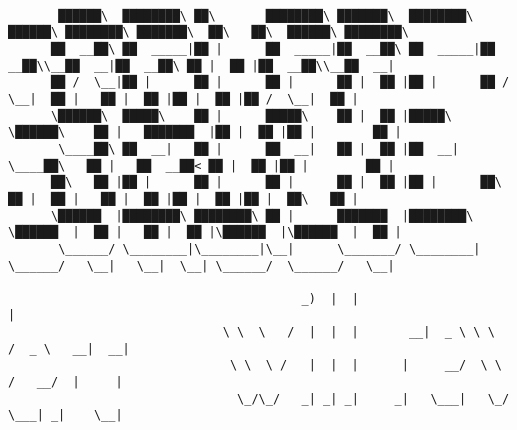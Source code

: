 \documentclass[varwidth=\maxdimen,margin=0.5cm,multi={verbatim}]{standalone}
\begin{document}
\begin{verbatim}

       ██████\  ████████\ ██\       ████████\ ███████\  ████████\  ██████\ ████████\ ███████\  ██\   ██\  ██████\ ████████\ 
      ██  __██\ ██  _____|██ |      ██  _____|██  __██\ ██  _____|██  __██\\__██  __|██  __██\ ██ |  ██ |██  __██\\__██  __|
      ██ /  \__|██ |      ██ |      ██ |      ██ |  ██ |██ |      ██ /  \__|  ██ |   ██ |  ██ |██ |  ██ |██ /  \__|  ██ |   
      \██████\  █████\    ██ |      █████\    ██ |  ██ |█████\    \██████\    ██ |   ███████  |██ |  ██ |██ |        ██ |   
       \____██\ ██  __|   ██ |      ██  __|   ██ |  ██ |██  __|    \____██\   ██ |   ██  __██< ██ |  ██ |██ |        ██ |   
      ██\   ██ |██ |      ██ |      ██ |      ██ |  ██ |██ |      ██\   ██ |  ██ |   ██ |  ██ |██ |  ██ |██ |  ██\   ██ |   
      \██████  |████████\ ████████\ ██ |      ███████  |████████\ \██████  |  ██ |   ██ |  ██ |\██████  |\██████  |  ██ |   
       \______/ \________|\________|\__|      \_______/ \________| \______/   \__|   \__|  \__| \______/  \______/   \__|

                                         _)  |  |                                    |   
                              \ \  \   /  |  |  |       __|  _ \ \ \   /  _ \   __|  __| 
                               \ \  \ /   |  |  |      |     __/  \ \ /   __/  |     |   
                                \_/\_/   _| _| _|     _|   \___|   \_/  \___| _|    \__|



\end{verbatim}
\end{document}
